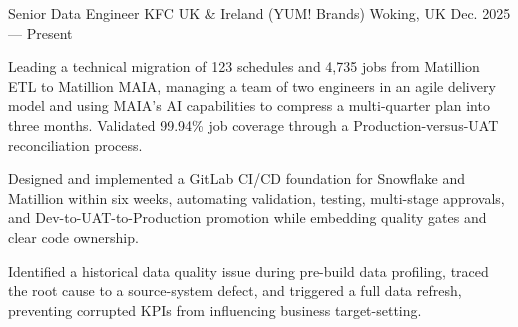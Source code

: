 
\begin{cventries}

  \cventry
    {Senior Data Engineer}
    {KFC UK \& Ireland (YUM! Brands)}
    {Woking, UK}
    {Dec. 2025 --- Present}
    {
      \begin{cvitems}
        \item {Leading a technical migration of 123 schedules and 4,735 jobs from Matillion ETL to Matillion MAIA, managing a team of two engineers in an agile delivery model and using MAIA's AI capabilities to compress a multi-quarter plan into three months. Validated 99.94\% job coverage through a Production-versus-UAT reconciliation process.}
        \item {Designed and implemented a GitLab CI/CD foundation for Snowflake and Matillion within six weeks, automating validation, testing, multi-stage approvals, and Dev-to-UAT-to-Production promotion while embedding quality gates and clear code ownership.}
        \item {Identified a historical data quality issue during pre-build data profiling, traced the root cause to a source-system defect, and triggered a full data refresh, preventing corrupted KPIs from influencing business target-setting.}
      \end{cvitems}
    }


\end{cventries}
